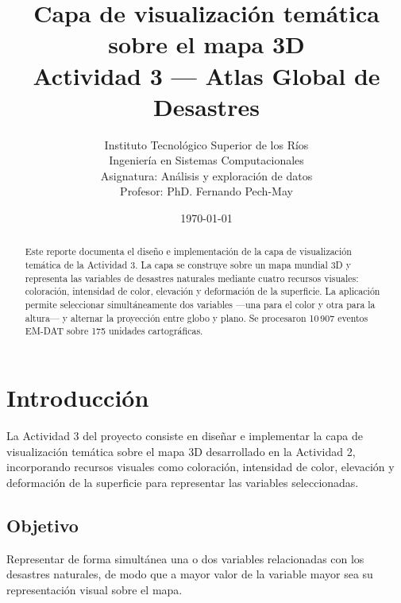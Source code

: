 \documentclass[11pt]{article}
\title{\textbf{Capa de visualización temática sobre el mapa 3D}\\[0.3em]
       \large Actividad 3 --- Atlas Global de Desastres}
\author{Instituto Tecnológico Superior de los Ríos\\
        Ingeniería en Sistemas Computacionales\\
        \small Asignatura: Análisis y exploración de datos\\
        \small Profesor: PhD. Fernando Pech-May}
\date{\today}
\begin{document}
\maketitle

\begin{abstract}
\noindent
Este reporte documenta el diseño e implementación de la capa de
visualización temática de la Actividad 3. La capa se construye sobre un
mapa mundial 3D y representa las variables de desastres naturales mediante
cuatro recursos visuales: coloración, intensidad de color, elevación y
deformación de la superficie. La aplicación permite seleccionar
simultáneamente dos variables ---una para el color y otra para la altura---
y alternar la proyección entre globo y plano. Se procesaron
10\,907 eventos EM-DAT sobre 175 unidades cartográficas.
\end{abstract}

\tableofcontents
\newpage

\section{Introducción}
La Actividad 3 del proyecto consiste en diseñar e implementar la capa de
visualización temática sobre el mapa 3D desarrollado en la Actividad 2,
incorporando recursos visuales como coloración, intensidad de color,
elevación y deformación de la superficie para representar las variables
seleccionadas.

\subsection*{Objetivo}
Representar de forma simultánea una o dos variables relacionadas con los
desastres naturales, de modo que a mayor valor de la variable mayor sea su
representación visual sobre el mapa.

\end{document}
